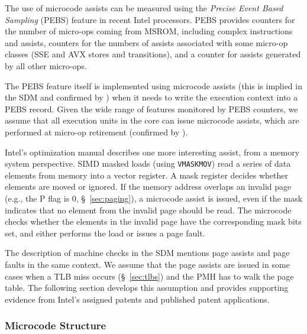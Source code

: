 
The use of microcode assists can be measured using the
\textit{Precise Event Based Sampling} (PEBS) feature in recent Intel
processors. PEBS provides counters for the number of micro-ops coming from
MSROM, including complex instructions and assists, counters for the numbers of
assists associated with some micro-op classes (SSE and AVX stores and
transitions), and a counter for assists generated by all other micro-ops.

The PEBS feature itself is implemented using microcode assists (this is implied
in the SDM and confirmed by \cite{intel2014pebs}) when it needs to write the
execution context into a PEBS record. Given the wide range of features
monitored by PEBS counters, we assume that all execution units in the core can
issue microcode assists, which are performed at micro-op retirement (confirmed
by \cite{intel1997events}).


Intel's optimization manual describes one more interesting assist, from a
memory system perspective. SIMD masked loads (using \texttt{VMASKMOV}) read a
series of data elements from memory into a vector register. A mask register
decides whether elements are moved or ignored. If the memory address overlaps
an invalid page (e.g., the P flag is 0, \S~\ref{sec:paging}), a microcode
assist is issued, even if the mask indicates that no element from the invalid
page should be read. The microcode checks whether the elements in the invalid
page have the corresponding mask bits set, and either performs the load or
issues a page fault.


The description of machine checks in the SDM mentions page assists and page
faults in the same context. We assume that the page assists are issued in some
cases when a TLB miss occurs (\S~\ref{sec:tlbs}) and the PMH has to walk the
page table. The following section develops this assumption and provides
supporting evidence from Intel's assigned patents and published patent
applications.


\subsubsection{Microcode Structure}
\label{sec:microcode_structure}

